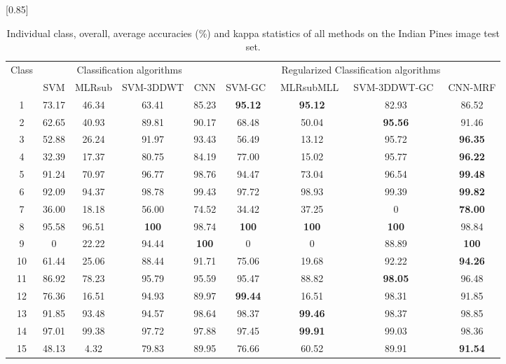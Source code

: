 \documentclass[journal]{IEEEtran}
\begin{document}
		\begin{table*}[t!]
			\caption{\label{table2} {{Individual class, overall, average  accuracies (\%) and kappa statistics of all methods on the Indian Pines image test set.}}}
			\begin{center}
				{\normalsize
					\scalebox{0.85}[0.85]
					{
						\begin{tabular}{|c||c|c|c|c|c|c|c|c|}
							\hline
							\multirow{2}{*}{Class} &
							\multicolumn{4}{c|}{Classification algorithms} &
							\multicolumn{4}{c|}{{{Regularized Classification}} algorithms} \\
							\cline{2-9}
							& SVM       & MLRsub & {{SVM-3DDWT}} & CNN & SVM-GC~\cite{tarabalka2010svm} & MLRsubMLL~\cite{li2012spectral} & {{SVM-3DDWT-GC}}~\cite{cao2017integration} &  CNN-MRF \\ 
							\hline
							1	& 73.17 & 46.34 & 63.41  & 85.23 & \bf{95.12}  & \bf{95.12} & 82.93  & 86.52 \\ 
2	& 62.65 & 40.93 & 89.81  & 90.17 & 68.48  & 50.04  & \bf{95.56} & 91.46 \\ 
3	& 52.88 & 26.24 & 91.97  & 93.43 & 56.49  & 13.12   & 95.72 &  \bf{96.35} \\ 
4	& 32.39 & 17.37 & 80.75  & 84.19 & 77.00  & 15.02  & 95.77 & \bf{96.22} \\ 
5	& 91.24 & 70.97 & 96.77  & 98.76 & 94.47  & 73.04   & 96.54 &  \bf{99.48} \\ 
6	& 92.09 & 94.37 & 98.78 &  99.43 & 97.72  & 98.93   & 99.39 &  \bf{99.82} \\ 
7	& 36.00 & 18.18 & 56.00 &  74.52 & 34.42   & 37.25  & 0  &  \bf{78.00} \\ 
8	& 95.58 & 96.51 & \bf{100} & 98.74 & \bf{100}  & \bf{100}    & \bf{100}  & 98.84 \\ 
9	& 0     & 22.22 & 94.44  &  \bf{100}   & 0    & 0      & 88.89    & \bf{100} \\ 
10	& 61.44 & 25.06 & 88.44 &  91.71 & 75.06 & 19.68  & 92.22 &  \bf{94.26} \\ 
11	& 86.92 & 78.23 & 95.79 &  95.59 & 95.47 & 88.82  & \bf{98.05} &  96.48 \\ 
12	& 76.36 & 16.51 & 94.93 &  89.97 & \bf{99.44} & 16.51  & 98.31 &  91.85 \\ 
13	& 91.85 & 93.48 & 94.57 &  98.64 & 98.37 & \bf{99.46}    & 98.37 &  98.85 \\ 
14	& 97.01 & 99.38 & 97.72 &  97.88 & 97.45 & \bf{99.91}    & 99.03 &  98.36 \\ 
15	& 48.13 & 4.32  & 79.83 &  89.95 & 76.66 & 60.52  & 89.91 &  \bf{91.54} \\ 

\end{tabular}}}
\end{center}
\end{table*}
\end{document}

